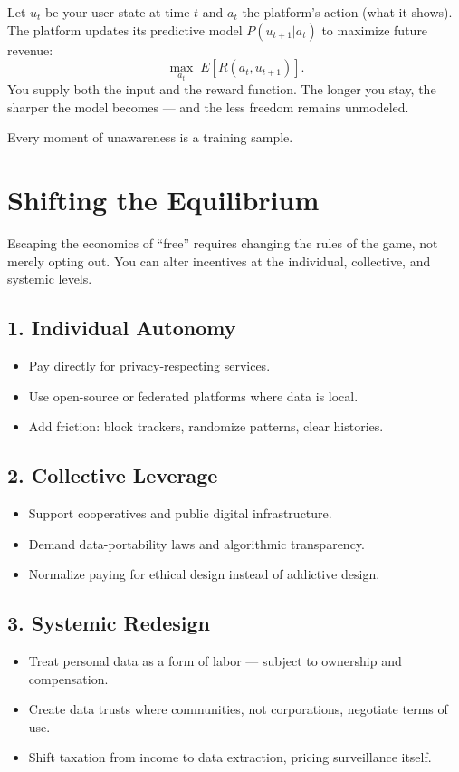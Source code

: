 \documentclass[12pt,twoside]{book}
\begin{document}
Let $u_t$ be your user state at time $t$ and $a_t$ the platform’s action (what it shows).  
The platform updates its predictive model $P(u_{t+1}|a_t)$ to maximize future revenue:
\[
\max_{a_t} \; E[R(a_t, u_{t+1})].
\]
You supply both the input and the reward function.  
The longer you stay, the sharper the model becomes --- and the less freedom remains unmodeled.

\begin{keyidea}
Every moment of unawareness is a training sample.
\end{keyidea}

\section{Shifting the Equilibrium}

Escaping the economics of “free” requires changing the rules of the game, not merely opting out.  
You can alter incentives at the individual, collective, and systemic levels.

\subsection*{1. Individual Autonomy}
\begin{itemize}
  \item Pay directly for privacy-respecting services.  
  \item Use open-source or federated platforms where data is local.  
  \item Add friction: block trackers, randomize patterns, clear histories.  
\end{itemize}

\subsection*{2. Collective Leverage}
\begin{itemize}
  \item Support cooperatives and public digital infrastructure.  
  \item Demand data-portability laws and algorithmic transparency.  
  \item Normalize paying for ethical design instead of addictive design.
\end{itemize}

\subsection*{3. Systemic Redesign}
\begin{itemize}
  \item Treat personal data as a form of labor --- subject to ownership and compensation.  
  \item Create data trusts where communities, not corporations, negotiate terms of use.  
  \item Shift taxation from income to data extraction, pricing surveillance itself.
\end{itemize}
\end{document}
